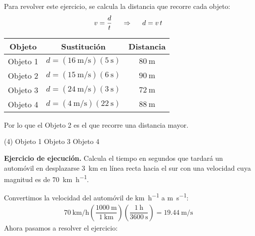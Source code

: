 \documentclass[12pt, letter]{exam}
\begin{document}
\begin{questions}
    \vspace*{1cm}
    Para revolver este ejercicio, se calcula la distancia que recorre cada objeto:
    \begin{align*}
    v = \dfrac{d}{t} \hspace{0.5cm} \Rightarrow \hspace{0.5cm} d = v \, t
    \end{align*}
    \begin{table}[H]
        \centering
        \renewcommand{\arraystretch}{2}
        \begin{tabular}{c | c | c}
            Objeto & Sustitución & Distancia \\ \hline
            Objeto 1 & $d = \left( \displaystyle \SI[per-mode=fraction]{16}{\meter\per\second} \right) (\SI{5}{\second})$ & $\SI{80}{\meter}$ \\ \hline
            Objeto 2 & $d = \left( \displaystyle \SI[per-mode=fraction]{15}{\meter\per\second} \right) (\SI{6}{\second})$ & $\SI{90}{\meter}$ \\ \hline
            Objeto 3 & $d = \left( \displaystyle \SI[per-mode=fraction]{24}{\meter\per\second} \right) (\SI{3}{\second})$ & $\SI{72}{\meter}$ \\ \hline
            Objeto 4 & $d = \left( \displaystyle \SI[per-mode=fraction]{4}{\meter\per\second} \right) (\SI{22}{\second})$ & $\SI{88}{\meter}$ \\ \hline
        \end{tabular}
    \end{table}
    Por lo que el Objeto 2 es el que recorre una distancia mayor.
    \begin{tasks}(4)
        \task Objeto 1
        \task {}
        \task Objeto 3
        \task Objeto 4        
    \end{tasks}
    \setcounter{question}{6} \question \label{Ejercicio_03} \textbf{Ejercicio de ejecución. } Calcula el tiempo en segundos que tardará un automóvil en desplazarse \SI{3}{\kilo\meter} en línea recta hacia el sur con una velocidad cuya magnitud es de \SI{70}{\kilo\meter\per\hour}.

    \vspace*{0.25cm}
    Convertimos la velocidad del automóvil de \unit{\kilo\meter\per\hour} a \unit{\meter\per\second}:
    \begin{align*}
        \SI[per-mode=fraction]{70}{\kilo\meter\per\hour} \left( \dfrac{\SI{1000}{\meter}}{\SI{1}{\kilo\meter}} \right) \left( \dfrac{\SI{1}{\hour}}{\SI{3600}{\second}} \right) = \SI[per-mode=fraction]{19.44}{\meter\per\second}
    \end{align*}
    Ahora pasamos a resolver el ejercicio:


\end{questions}
\end{document}
